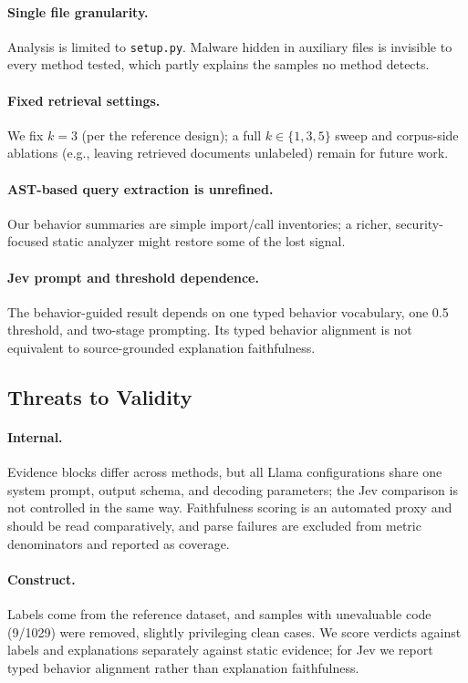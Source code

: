 \paragraph{Single file granularity.} Analysis is limited to
\texttt{setup.py}. Malware hidden in auxiliary files is invisible to every
method tested, which partly explains the samples no method detects.

\paragraph{Fixed retrieval settings.} We fix $k=3$ (per the reference
design); a full $k\in\{1,3,5\}$ sweep and corpus-side ablations (e.g.,
leaving retrieved documents unlabeled) remain for future work.

\paragraph{AST-based query extraction is unrefined.} Our behavior
summaries are simple import/call inventories; a richer, security-focused
static analyzer might restore some of the lost signal.

\paragraph{Jev prompt and threshold dependence.} The behavior-guided
result depends on one typed behavior vocabulary, one 0.5 threshold, and
two-stage prompting. Its typed behavior alignment is not equivalent to
source-grounded explanation faithfulness.

\subsection{Threats to Validity}
\label{sec:threats}

\paragraph{Internal.} Evidence blocks differ across methods, but all Llama
configurations share one system prompt, output schema, and decoding
parameters; the Jev comparison is not controlled in the same way.
Faithfulness scoring is an automated proxy and should be read
comparatively, and parse failures are excluded from metric denominators and
reported as coverage.

\paragraph{Construct.} Labels come from the reference dataset, and samples
with unevaluable code (9/1029) were removed, slightly privileging clean
cases. We score verdicts against labels and explanations separately against
static evidence; for Jev we report typed behavior alignment rather than
explanation faithfulness.

